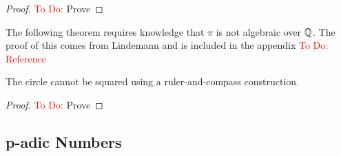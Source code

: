 \begin{proof}  
    \textcolor{red}{To Do:} Prove
\end{proof}

The following theorem requires knowledge that $\pi$ is not algebraic over $\mathbb Q$. The proof of this comes from Lindemann and is included in the appendix \textcolor{red}{To Do: Reference}

\begin{theorem}
    The circle cannot be squared using a ruler-and-compass construction.
\end{theorem}

\begin{proof}  
    \textcolor{red}{To Do:} Prove
\end{proof}

\subsection{p-adic Numbers}